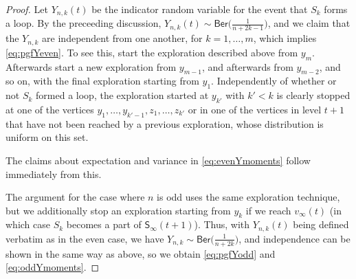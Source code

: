 \documentclass[a4paper,11pt,reqno]{amsart}
\newcommand{\paul}[1]{\todo[color=yellow!70,inline]{Paul: #1}}
\newcommand{\fabian}[1]{\todo[color=red!50,inline]{Fabian: #1}}
\newcommand{\Br}{\mathsf{Br}}
\newcommand{\Soo}{\mathsf{S}_\infty}
\newcommand{\Ber}{\mathsf{Ber}}
\theoremstyle{definition}
\begin{document}
\begin{proof}
 Let  $Y_{n,k}(t)$ be the indicator random variable for the event that $S_k$ forms a loop. By the preceeding discussion, $Y_{n,k}(t)\sim \Ber\big(\frac{1}{n+2k-1}\big)$, and we claim that the $Y_{n,k}$ are independent from one another, for $k=1,\dots,m$, which implies \eqref{eq:pgfYeven}. 
 To see this, start the exploration described above from $y_m$. Afterwards start a new exploration from $y_{m-1}$, and afterwards from $y_{m-2}$, and so on, with the final exploration starting from $y_1$.
Independently of whether or not $S_k$ formed a loop, the exploration started at $y_{k'}$ with $k'<k$ is clearly stopped at one of the vertices $y_1,\dots,y_{k'-1}, z_1,\dots, z_{k'}$ or in one of the vertices in level $t+1$ that have not been reached by a previous exploration, whose distribution is uniform on this set.
 
 The claims about expectation and variance in \eqref{eq:evenYmoments} follow immediately from this. 
 
 The argument for the case where $n$ is odd uses the same exploration technique, but we additionally stop an  exploration starting from $y_k$ if we reach $v_\infty(t)$ (in which case $S_k$ becomes a part of $\Soo(t+1)$). Thus, with $Y_{n,k}(t)$ being defined verbatim as in the even case, we have $Y_{n,k}\sim \Ber\big(\frac{1}{n+2k}\big)$, and independence can be shown in the same way as above, so we obtain \eqref{eq:pgfYodd} and \eqref{eq:oddYmoments}. 
\end{proof}
 
\end{document}
